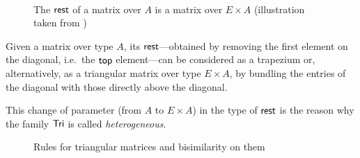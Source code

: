 \documentclass[a4paper,USenglish]{lipics}
\begin{document}
\begin{ex}
\begin{Long}
\begin{figure}[hbt]
\\[-2ex]
  \caption{The $\mathsf{rest}$ of a matrix over $A$ is a matrix over $E\times A$ (illustration taken from \parencite{DBLP:conf/types/MatthesP11})}
  \label{fig:tri_trap}
\end{figure}
\end{Long}
\begin{Short}
 Given a matrix over type $A$, its $\mathsf{rest}$---obtained by removing the first element on the diagonal, i.e.\ the $\mathsf{top}$ element---can 
 be considered as a trapezium or, alternatively, as a triangular matrix over type $E\times A$, 
 by bundling the entries of the diagonal with those directly above the diagonal. 
\end{Short}
This change of parameter (from $A$ to $E \times A$) in the type of $\mathsf{rest}$ is the reason why the family $\mathsf{Tri}$ is called \emph{heterogeneous}.

 
 \begin{figure}
 \begin{mdframed}
  
 \end{mdframed}
 \caption{Rules for triangular matrices and bisimilarity on them} \label{tri_rules}
\end{figure}
 

\begin{comment}
\begin{figure}[bt]
  \centering

     \def\extraVskip{3pt}
     \def\proofSkipAmount{\vskip.8ex plus.8ex minus.4ex}
    \AxiomC{$t : \Tri~A$} %
     \UnaryInfC{$\head_A~t : A$}
      \DisplayProof
                        \hspace{3ex}
                                       \AxiomC{$t : \Tri~A$}%
                                       \UnaryInfC{$\tail_A~t : \Tri(E\times A)$}
                                       \DisplayProof%
% 
% 
% 
 \hspace{3ex}
                                            \def\extraVskip{3pt}
     \def\proofSkipAmount{\vskip.8ex plus.8ex minus.4ex}
    \AxiomC{$t \sim t'$}%
     \UnaryInfC{$\head~t = \head~t'$}
      \DisplayProof
                        \hspace{3ex}
                                       \AxiomC{$t \sim t'$}%
                                       \UnaryInfC{$ \tail~t \sim \tail~t'$}
                                       \DisplayProof   


\end{comment}
\end{ex}
\end{document}
